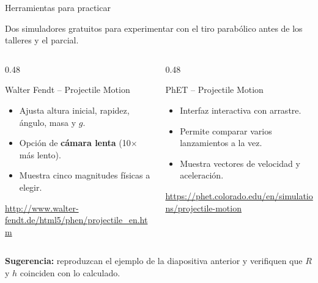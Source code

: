 \documentclass[aspectratio=169,xcolor=dvipsnames]{beamer}
\begin{document}
	\begin{frame}{Herramientas para practicar}
		\begin{center}
			\small Dos simuladores gratuitos para experimentar con el tiro parabólico
			antes de los talleres y el parcial.
		\end{center}
		
		\vspace{0.4cm}
		\begin{columns}[T]
			\begin{column}{0.48\textwidth}
				\begin{block}{Walter Fendt -- Projectile Motion}
					\small
					\begin{itemize}
						\item Ajusta altura inicial, rapidez, ángulo, masa y $g$.
						\item Opción de \textbf{cámara lenta} (10$\times$ más lento).
						\item Muestra cinco magnitudes físicas a elegir.
					\end{itemize}
					\vspace{0.2cm}
					\centering
					\footnotesize\url{http://www.walter-fendt.de/html5/phen/projectile_en.htm}
				\end{block}
			\end{column}
			\begin{column}{0.48\textwidth}
				\begin{block}{PhET -- Projectile Motion}
					\small
					\begin{itemize}
						\item Interfaz interactiva con arrastre.
						\item Permite comparar varios lanzamientos a la vez.
						\item Muestra vectores de velocidad y aceleración.
					\end{itemize}
					\vspace{0.2cm}
					\centering
					\footnotesize\url{https://phet.colorado.edu/en/simulations/projectile-motion}
				\end{block}
			\end{column}
		\end{columns}
		
		\vspace{0.35cm}
		\begin{center}
			\small \textcolor{UnalGreen}{\textbf{Sugerencia:}} reproduzcan el ejemplo de la diapositiva anterior
			y verifiquen que $R$ y $h$ coinciden con lo calculado.
		\end{center}
	\end{frame}
	
\end{document}
